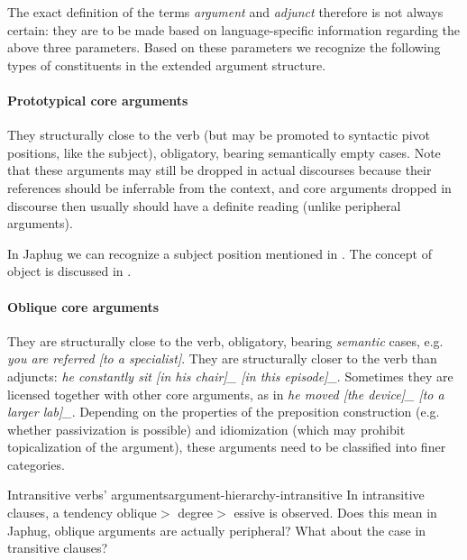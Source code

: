 \documentclass[a4paper, oneside, 12pt]{report}
\newcommand*{\textgt}{$>$ }
\newcommand*{\term}[1]{\emph{#1}}
\newcommand{\form}[1]{\emph{#1}}
\begin{document}
The exact definition of the terms \term{argument} and \term{adjunct}
therefore is not always certain:
they are to be made based on language-specific information regarding the above three parameters.
Based on these parameters we recognize the following types 
of constituents in the extended argument structure.

\paragraph*{Prototypical core arguments}
They structurally close to the verb
(but may be promoted to syntactic pivot positions, like the subject),
obligatory, bearing semantically empty cases.
Note that these arguments may still be dropped in actual discourses
because their references should be inferrable from the context,
and core arguments dropped in discourse then usually should have a definite reading
(unlike peripheral arguments).

In Japhug we can recognize a subject position mentioned in .
The concept of object is discussed in .

\paragraph*{Oblique core arguments}
They are structurally close to the verb,
obligatory, bearing \emph{semantic} cases,
e.g. \form{you are referred [to a specialist]}.
They are structurally closer to the verb than adjuncts:
\form{he constantly sit [in his chair]_{} [in this episode]_{\text{adjunct}}}.
Sometimes they are licensed together with other core arguments,
as in \form{he moved [the device]_{} [to a larger lab]_{\text{oblique argument (goal)}}}.
Depending on the properties of the preposition construction
(e.g. whether passivization is possible)
and idiomization (which may prohibit topicalization of the argument),
these arguments need to be classified into finer categories.

\begin{todobox}{Intransitive verbs' arguments}{argument-hierarchy-intransitive}
    In intransitive clauses, a tendency oblique\textgt degree\textgt essive is observed.
    Does this mean in Japhug, oblique arguments are actually peripheral?
    What about the case in transitive clauses? 
\end{todobox}
\end{document}
